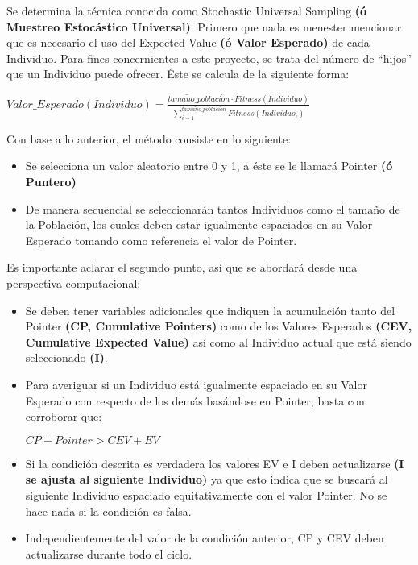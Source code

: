 \documentclass[class=report, crop=false]{standalone}
\begin{document}
\begin{fulllineitems}

\begin{DUlineblock}{0em}
\item[] Se determina la técnica conocida como Stochastic 
Universal Sampling \textbf{(ó Muestreo Estocástico Universal)}.\break
Primero que nada es menester mencionar que es necesario 
el uso del Expected Value \textbf{(ó Valor Esperado)} 
de cada Individuo.\medskip\break
Para fines concernientes a este proyecto, se trata 
del número de ``hijos'' que un Individuo puede 
ofrecer. Éste se calcula de la siguiente forma:

\begin{center}\(Valor\_Esperado(Individuo) = \frac{tama\tilde{n}o\_poblaci\acute{o}n \cdot Fitness(Individuo)}{\sum_{i=1}^{tama\tilde{n}o\_poblaci\acute{o}n}Fitness(Individuo_i)}\)
\end{center}

Con base a lo anterior, el método consiste en lo siguiente:

\begin{itemize}
\item Se selecciona un valor aleatorio entre 0 y 1, a éste se le llamará Pointer \textbf{(ó Puntero)}
\item De manera secuencial se seleccionarán tantos Individuos como el tamaño de la Población, los cuales deben estar igualmente espaciados en su Valor Esperado tomando como referencia el valor de Pointer.
\end{itemize}

Es importante aclarar el segundo punto, así que se abordará 
desde una perspectiva computacional:

\begin{itemize}
\item Se deben tener variables adicionales que indiquen la acumulación tanto del Pointer \textbf{(CP, Cumulative Pointers)} como de los Valores Esperados \textbf{(CEV, Cumulative Expected Value)} así como al Individuo actual que está siendo seleccionado \textbf{(I)}.
\item Para averiguar si un Individuo está igualmente espaciado en su Valor Esperado con respecto de los demás basándose en Pointer, basta con corroborar que:

\begin{center}\(CP + Pointer > CEV + EV\)
\end{center}

\item Si la condición descrita es verdadera los valores EV e I deben actualizarse \textbf{(I se ajusta al siguiente Individuo)} ya que esto indica que se buscará al siguiente Individuo espaciado equitativamente con el valor Pointer. No se hace nada si la condición es falsa.
\item Independientemente del valor de la condición anterior, CP y CEV deben actualizarse durante todo el ciclo.
\end{itemize}


\end{DUlineblock}
\end{fulllineitems}
\end{document}
